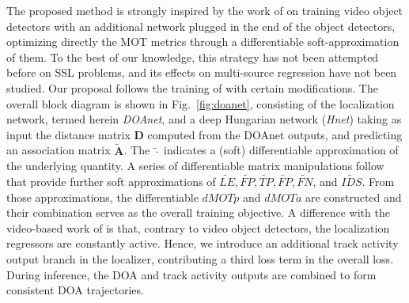 \documentclass[conference]{IEEEtran}
\def\D {\mathbf{D}}
\def\A {\mathbf{A}}
\begin{document}
The proposed method is strongly inspired by the work of \cite{xu2020train} on training video object detectors with an additional network plugged in the end of the object detectors, optimizing directly the MOT metrics through a differentiable soft-approximation of them. To the best of our knowledge, this strategy has not been attempted before on SSL problems, and its effects on multi-source regression have not been studied. Our proposal follows the training of \cite{xu2020train} with certain modifications. The overall block diagram is shown in Fig.~\ref{fig:doanet}, consisting of the localization network, termed herein \emph{DOAnet}, and a deep Hungarian network (\emph{Hnet}) taking as input the distance matrix $\mathbf{D}$ computed from the DOAnet outputs, and predicting an association matrix $\tilde{\mathbf{A}}$. The $\tilde{\cdot}$ indicates a (soft) differentiable approximation of the underlying quantity. A series of differentiable matrix manipulations follow that provide  further soft approximations of $\tilde{LE}, \tilde{FP}, \tilde{TP}, \tilde{FP}, \tilde{FN}$, and $\tilde{IDS}$. From those approximations, the differentiable $dMOTp$ and $dMOTa$ are constructed and their combination serves as the overall training objective. A difference with the video-based work of \cite{xu2020train} is that, contrary to video object detectors, the localization regressors are constantly active. Hence, we introduce an additional track activity output branch in the localizer, contributing a third loss term in the overall loss. During inference, the DOA and track activity outputs are combined to form consistent DOA trajectories.

\end{document}
